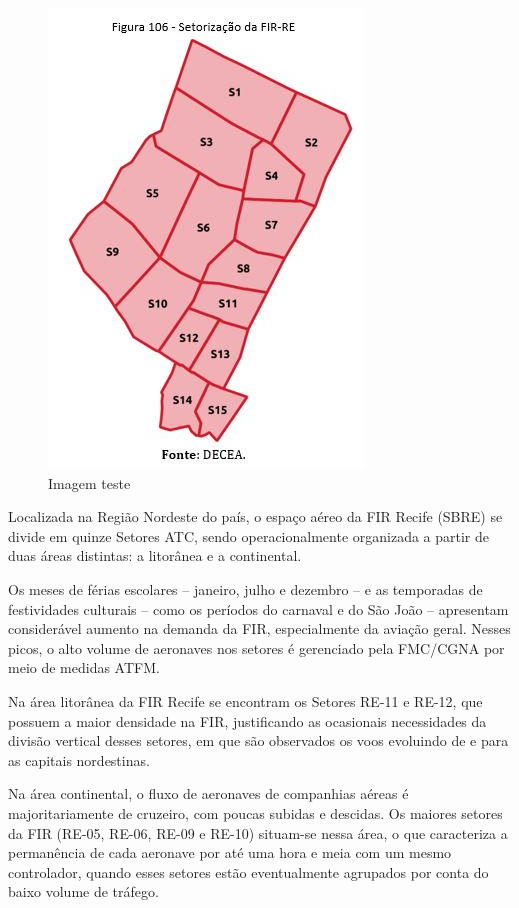 \documentclass[
]{book}
\begin{document}
\begin{figure}
\centering
\includegraphics{imagens/fig98.jpg}
\caption{Imagem teste}
\end{figure}

Localizada na Região Nordeste do país, o espaço aéreo da FIR Recife (SBRE) se divide em quinze Setores ATC, sendo operacionalmente organizada a partir de duas áreas distintas: a litorânea e a continental.

Os meses de férias escolares -- janeiro, julho e dezembro -- e as temporadas de festividades culturais -- como os períodos do carnaval e do São João -- apresentam considerável aumento na demanda da FIR, especialmente da aviação geral. Nesses picos, o alto volume de aeronaves nos setores é gerenciado pela FMC/CGNA por meio de medidas ATFM.

Na área litorânea da FIR Recife se encontram os Setores RE-11 e RE-12, que possuem a maior densidade na FIR, justificando as ocasionais necessidades da divisão vertical desses setores, em que são observados os voos evoluindo de e para as capitais nordestinas.

Na área continental, o fluxo de aeronaves de companhias aéreas é majoritariamente de cruzeiro, com poucas subidas e descidas. Os maiores setores da FIR (RE-05, RE-06, RE-09 e RE-10) situam-se nessa área, o que caracteriza a permanência de cada aeronave por até uma hora e meia com um mesmo controlador, quando esses setores estão eventualmente agrupados por conta do baixo volume de tráfego.
\end{document}
